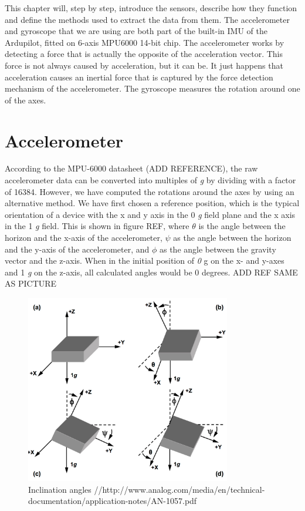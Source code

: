 This chapter will, step by step, introduce the sensors, describe how they function and define the methods used to extract the data from them. The accelerometer and gyroscope that we are using are both part of the built-in IMU of the Ardupilot, fitted on 6-axis MPU6000 14-bit chip. The accelerometer works by detecting a force that is actually the opposite of the acceleration vector. This force is not always caused by acceleration, but it can be. It just happens that acceleration causes an inertial force that is captured by the force detection mechanism of the accelerometer. The gyroscope measures the rotation around one of the axes.

\section{Accelerometer}
According to the MPU-6000 datasheet (ADD REFERENCE), the raw accelerometer data can be converted into multiples of \textit{g} by dividing with a factor of 16384. However, we have computed the rotations around the axes by using an alternative method. We have first chosen a reference position, which is the typical orientation of a device with the x and y axis in the 0 \textit{g} field plane and the x axis in the 1 \textit{g} field. This is shown in figure REF, where $\theta$ is the angle between the horizon and the x-axis of the accelerometer, $\psi$ as the angle between the horizon and the y-axis of the accelerometer, and
$\phi$ as the angle between the gravity vector and the z-axis. When in the initial position of \textit{0} g on the x- and y-axes and 1 \textit{g} on the z-axis, all calculated angles would be 0 degrees. ADD REF SAME AS PICTURE

\begin{figure}[H]
  \centering
    \includegraphics[width=0.8\textwidth]{images/accangle.png}
	\caption{Inclination angles //http://www.analog.com/media/en/technical-documentation/application-notes/AN-1057.pdf}
	\label{acc}
\end{figure} 

